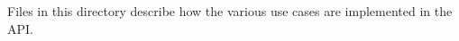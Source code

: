 \label{doc_contrib_api_usecases_README_md_md_doc_contrib_api_usecases_README}%
%
Files in this directory describe how the various use cases are implemented in the API. 